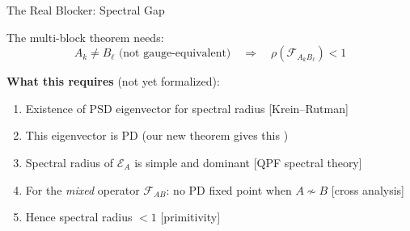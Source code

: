 \documentclass[aspectratio=169,10pt]{beamer}
\begin{document}
\begin{frame}{The Real Blocker: Spectral Gap}
    \vspace{-0.3em}

    The multi-block theorem needs:
    \[
        A_k \neq B_\ell \text{ (not gauge-equivalent)} \quad\Longrightarrow\quad
        \rho\!\left(\mathcal{F}_{A_k B_\ell}\right) < 1
    \]

    \vspace{0.2em}
    \textbf{What this requires} (not yet formalized):
    \begin{enumerate}\itemsep0.15em\small
        \item Existence of PSD eigenvector for spectral radius \hfill\textcolor{softred}{[Krein--Rutman]}
        \item This eigenvector is PD (our new theorem gives this \textcolor{leangreen}{\checkmark})
        \item Spectral radius of $\mathcal{E}_A$ is simple and dominant \hfill\textcolor{softred}{[QPF spectral theory]}
        \item For the \emph{mixed} operator $\mathcal{F}_{AB}$: no PD fixed point when $A \not\sim B$
            \hfill\textcolor{softred}{[cross analysis]}
        \item Hence spectral radius $< 1$ \hfill\textcolor{softred}{[primitivity]}
    \end{enumerate}

    \vspace{0.3em}
    \begin{center}
    \end{center}
\end{frame}
\end{document}
